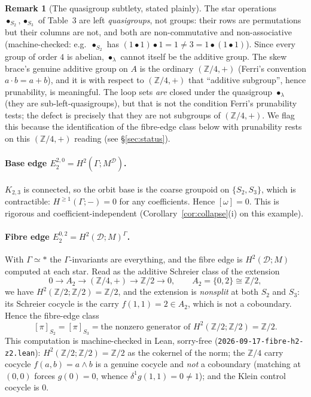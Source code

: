 \documentclass[11pt]{article}
\theoremstyle{definition}
\newtheorem{remark}[theorem]{Remark}
\newcommand{\D}{\mathcal{D}}
\newcommand{\Z}{\mathbb{Z}}
\begin{document}
\begin{remark}[The quasigroup subtlety, stated plainly]\label{rmk:quasigroup}
The star operations $\bullet_{S_2},\bullet_{S_3}$ of Table~3 are left \emph{quasigroups}, not
groups: their rows are permutations but their columns are not, and both are non-commutative
and non-associative (machine-checked: e.g.\ $\bullet_{S_2}$ has $(1\bullet1)\bullet1=1\neq
3=1\bullet(1\bullet1)$). Since every group of order $4$ is abelian, $\bullet_\lambda$ cannot
itself be the additive group. The skew brace's genuine additive group on $A$ is the ordinary
$(\Z/4,+)$ (Ferri's convention $a\cdot b=a+b$), and it is with respect to $(\Z/4,+)$ that
``additive subgroup'', hence prunability, is meaningful. The loop sets \emph{are} closed
under the quasigroup $\bullet_\lambda$ (they are sub-left-quasigroups), but that is not the
condition Ferri's prunability tests; the defect is precisely that they are not subgroups of
$(\Z/4,+)$. We flag this because the identification of the fibre-edge class below with
prunability rests on this $(\Z/4,+)$ reading (see \S\ref{sec:status}).
\end{remark}

\paragraph{Base edge $E_2^{2,0}=H^2(\Gamma;M^\D)$.} $K_{2,3}$ is connected, so the orbit
base is the coarse groupoid on $\{S_2,S_3\}$, which is contractible: $H^{\ge1}(\Gamma;-)=0$
for any coefficients. Hence $[\omega]=0$. This is rigorous and coefficient-independent
(Corollary~\ref{cor:collapse}(i) on this example).

\paragraph{Fibre edge $E_2^{0,2}=H^2(\D;M)^\Gamma$.} With $\Gamma\simeq\ast$ the $\Gamma$-in\-vari\-ants
are everything, and the fibre edge is $H^2(\D;M)$ computed at each star. Read as the additive
Schreier class of the extension
\[
   0\longrightarrow A_2\longrightarrow(\Z/4,+)\longrightarrow \Z/2\longrightarrow0,
   \qquad A_2=\{0,2\}\cong\Z/2,
\]
we have $H^2(\Z/2;\Z/2)=\Z/2$, and the extension is \emph{nonsplit} at both $S_2$ and $S_3$:
its Schreier cocycle is the carry $f(1,1)=2\in A_2$, which is not a coboundary. Hence the
fibre-edge class
\[
   [\pi]_{S_2}=[\pi]_{S_3}=\text{the nonzero generator of }H^2(\Z/2;\Z/2)=\Z/2 .
\]
This computation is machine-checked in Lean, sorry-free
(\texttt{2026-09-17-}\allowbreak\texttt{fibre-h2-z2.lean}): $H^2(\Z/2;\Z/2)=\Z/2$ as the cokernel of the norm;
the $\Z/4$ carry cocycle $f(a,b)=a\wedge b$ is a genuine cocycle and \emph{not} a coboundary
(matching at $(0,0)$ forces $g(0)=0$, whence $\delta^1 g(1,1)=0\neq1$); and the Klein control
cocycle is $0$.
\end{document}
